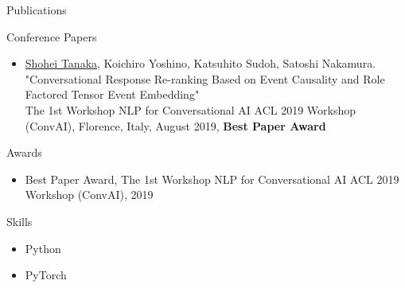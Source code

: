 \documentclass{resume} %
\begin{document}

\begin{rSection}{Publications}

\begin{rSubsection}{Conference Papers}{}{}{}
\begin{itemize}
\item \underline{Shohei Tanaka}, Koichiro Yoshino, Katsuhito Sudoh, Satoshi Nakamura.
\\"Conversational Response Re-ranking Based on Event Causality and Role Factored Tensor Event Embedding"
\\The 1st Workshop NLP for Conversational AI ACL 2019 Workshop (ConvAI), Florence, Italy, August 2019, {\bf Best Paper Award}
\end{itemize}
\end{rSubsection}

\end{rSection}


\begin{rSection}{Awards}

\begin{itemize}
    \item Best Paper Award, The 1st Workshop NLP for Conversational AI ACL 2019 Workshop (ConvAI), 2019
\end{itemize}

\end{rSection}


\begin{rSection}{Skills}

\begin{itemize}
    \item Python
    \item PyTorch
\end{itemize}

\end{rSection}
\end{document}
